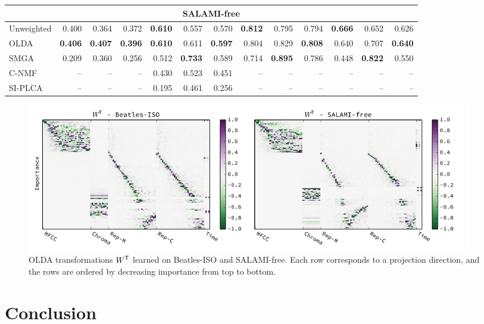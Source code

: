 \documentclass{article}
\begin{document}
\begin{table}
\begin{tabular}{lrrrrrrrrrrrr}
\multicolumn{13}{c}{SALAMI-free}\\
\toprule%
Unweighted  & 0.400 & 0.364 & 0.372 & \textbf{0.610} & 0.557 & 0.570 & \textbf{0.812} & 0.795 & 0.794 & \textbf{0.666} & 0.652 & 0.626\\
OLDA    & \textbf{0.406} & \textbf{0.407} & \textbf{0.396} & \textbf{0.610} & 0.611 & \textbf{0.597} & 0.804 & 0.829 & \textbf{0.808} & 0.640 & 0.707 & \textbf{0.640}\\
\hline
SMGA~\hfill\cite{serra2012unsupervised}
        & 0.209 & 0.360 & 0.256 & 0.512 & \textbf{0.733} & 0.589 & 0.714 & \textbf{0.895} & 0.786 & 0.448 & \textbf{0.822} & 0.550\\
C-NMF~\hfill\cite{nieto2013convex}            
        & -- & -- & -- & 0.430 & 0.523 & 0.451 & -- & -- & -- & -- & -- & -- \\
SI-PLCA~\hfill\cite{weiss2011unsupervised}    
        & -- & -- & -- & 0.195 & 0.461 & 0.256 & -- & -- & -- & -- & -- & -- \\  
\bottomrule%
\end{tabular}
\end{table}

\begin{figure}
\centering%
\includegraphics[width=0.95\textwidth]{figs/w}%
\vspace{-\baselineskip}%
\caption{OLDA transformations $W^\mathsf{T}$ learned on Beatles-ISO and SALAMI-free. Each row corresponds to a projection
direction, and the rows are ordered by decreasing importance from top to bottom.\label{fig:w}}
\end{figure}

\section{Conclusion}
\label{sec:conclusion}



\cleardoublepage%

\end{document}
